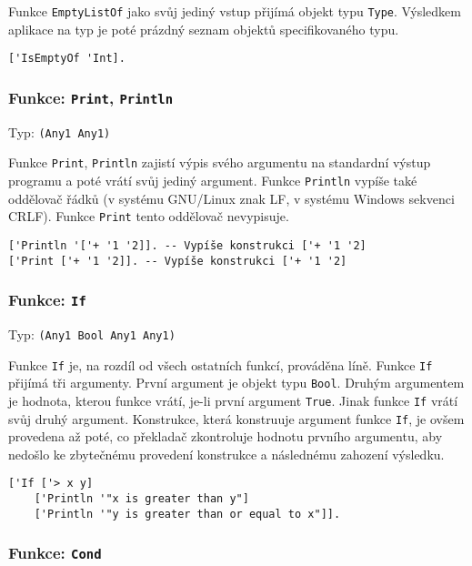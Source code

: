 Funkce \lstinline{EmptyListOf} jako svůj jediný vstup přijímá objekt typu \lstinline{Type}.
Výsledkem aplikace na typ je poté prázdný seznam objektů specifikovaného typu.

\begin{lstlisting}[caption={Ukázka využití EmptyListOf}]
['IsEmptyOf 'Int].
\end{lstlisting}

\subsubsection*{Funkce: \lstinline|Print|, \lstinline{Println}}
Typ: \lstinline{(Any1 Any1)}

Funkce \lstinline{Print}, \lstinline{Println} zajistí výpis svého argumentu na standardní výstup
programu a poté vrátí svůj jediný argument. Funkce \lstinline{Println} vypíše také oddělovač řádků
(v systému GNU/Linux znak LF, v systému Windows sekvenci CRLF). Funkce \lstinline{Print} tento
oddělovač nevypisuje.

\begin{lstlisting}[caption={Ukázka využití Print, Println}]
['Println '['+ '1 '2]]. -- Vypíše konstrukci ['+ '1 '2]
['Print ['+ '1 '2]]. -- Vypíše konstrukci ['+ '1 '2]
\end{lstlisting}

\subsubsection*{Funkce: \lstinline{If}}
Typ: \lstinline{(Any1 Bool Any1 Any1)}

Funkce \lstinline{If} je, na rozdíl od všech ostatních funkcí, prováděna líně. Funkce \lstinline{If}
přijímá tři argumenty. První argument je objekt typu \lstinline{Bool}. Druhým argumentem je hodnota,
kterou funkce vrátí, je-li první argument \lstinline{True}. Jinak funkce \lstinline{If} vrátí svůj
druhý argument. Konstrukce, která konstruuje argument funkce \lstinline{If}, je ovšem provedena až
poté, co překladač zkontroluje hodnotu prvního argumentu, aby nedošlo ke zbytečnému provedení
konstrukce a následnému zahození výsledku.

\begin{lstlisting}[caption={Ukázka využití If}]
['If ['> x y]
    ['Println '"x is greater than y"]
    ['Println '"y is greater than or equal to x"]].
\end{lstlisting}

\subsubsection*{Funkce: \lstinline{Cond}}\label{cond-documentation}

